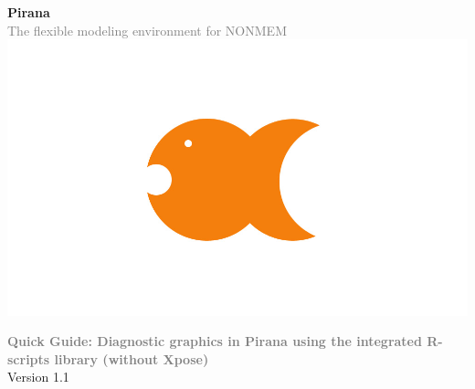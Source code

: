 \documentclass[a4,10pt]{article} \usepackage[pdftex]{graphicx}
\renewcommand{\emph}[1]{\textbf{\textcolor{Grey}{#1}}}
\begin{document}
{\centering
  \vspace{-100pt}
  \textbf{
    \textcolor{PiranaOrange}{\Large Pirana}
  }\\
  \vspace{5pt} \scriptsize \textcolor{Grey}{The flexible modeling
    environment for NONMEM} \\ \normalsize
  \vspace{12pt}
  \hspace{5pt}\includegraphics[scale=0.14]{images/pirana_logo.jpg}\\
  \vspace{18pt}

  {\large \emph{Quick Guide: Diagnostic graphics in Pirana using the
      integrated R-scripts library (without Xpose)} \vspace{10pt}
    \\ Version 1.1 }

}
\vspace{25pt}


\end{document}
